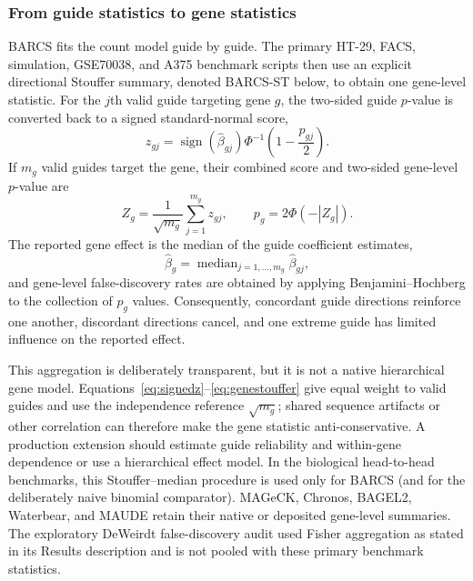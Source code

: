 \subsubsection{From guide statistics to gene statistics}

BARCS fits the count model guide by guide.  The primary HT-29, FACS,
simulation, GSE70038, and A375 benchmark scripts then use an explicit
directional Stouffer summary, denoted BARCS-ST below, to obtain one gene-level
statistic.
For the $j$th valid guide targeting gene $g$, the two-sided guide $p$-value is
converted back to a signed standard-normal score,
\begin{equation}
  z_{gj}
  =
  \operatorname{sign}(\widehat{\beta}_{gj})
  \Phi^{-1}\!\left(1-\frac{p_{gj}}{2}\right).
  \label{eq:signedz}
\end{equation}
If $m_g$ valid guides target the gene, their combined score and two-sided
gene-level $p$-value are
\begin{equation}
  Z_g=\frac{1}{\sqrt{m_g}}\sum_{j=1}^{m_g}z_{gj},
  \qquad
  p_g=2\Phi(-|Z_g|).
  \label{eq:genestouffer}
\end{equation}
The reported gene effect is the median of the guide coefficient estimates,
\begin{equation}
  \widehat{\beta}_g
  =\operatorname{median}_{j=1,\ldots,m_g}
    \widehat{\beta}_{gj},
  \label{eq:geneeffect}
\end{equation}
and gene-level false-discovery rates are obtained by applying
Benjamini--Hochberg to the collection of $p_g$ values.  Consequently,
concordant guide directions reinforce one another, discordant directions
cancel, and one extreme guide has limited influence on the reported effect.

This aggregation is deliberately transparent, but it is not a native
hierarchical gene model.  Equations~\eqref{eq:signedz}--\eqref{eq:genestouffer}
give equal weight to valid guides and use the independence reference
$\sqrt{m_g}$; shared sequence artifacts or other correlation can therefore
make the gene statistic anti-conservative.  A production extension should
estimate guide reliability and within-gene dependence or use a hierarchical
effect model.  In the biological head-to-head benchmarks, this
Stouffer--median procedure is used only for BARCS (and for the deliberately
naive binomial comparator).  MAGeCK, Chronos, BAGEL2, Waterbear, and MAUDE
retain their native or deposited gene-level summaries.  The exploratory
DeWeirdt false-discovery audit used Fisher aggregation as stated in its
Results description and is not pooled with these primary benchmark
statistics.

